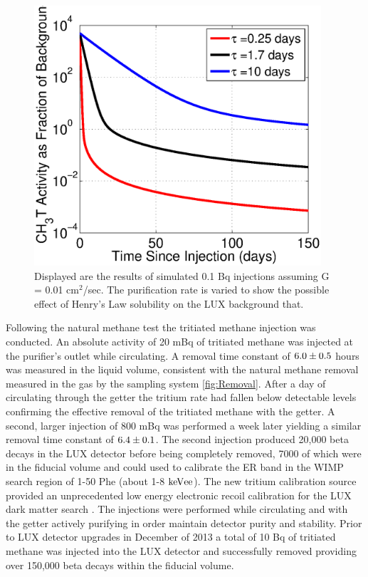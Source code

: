 \begin{figure}[H]
\centering
\includegraphics[width=0.95\textwidth]{tau_var_CH3T.eps}
\caption{Displayed are the results of simulated 0.1 Bq injections assuming G = 0.01 cm$^2$/sec. The purification rate is varied to show the possible effect of Henry's Law solubility on the LUX background that.}
\label{fig:tau_var}
\end{figure}


Following the natural methane test the tritiated methane injection was conducted. An absolute activity of 20 mBq of tritiated methane was injected at the purifier's outlet while circulating. A removal time constant of $\rm 6.0 \pm 0.5$ hours was measured in the liquid volume, consistent with the natural methane removal measured in the gas by the sampling system \ref{fig:Removal}. After a day of circulating through the getter the tritium rate had fallen below detectable levels confirming the effective removal of the tritiated methane with the getter. A second, larger injection of 800 mBq was performed a week later yielding a similar removal time constant of $\rm 6.4 \pm 0.1$. The second injection produced 20,000 beta decays in the LUX detector before being completely removed, 7000 of which were in the fiducial volume and could used to calibrate the ER band in the WIMP search region of 1-50 Phe (about 1-8 $\rm keV{ee}$). The new tritium calibration source provided an unprecedented low energy electronic recoil calibration for the LUX dark matter search \cite{LUX_PRL}. The injections were performed while circulating and with the getter actively purifying in order maintain detector purity and stability. Prior to LUX detector upgrades in December of 2013 a total of 10 Bq of tritiated methane was injected into the LUX detector and successfully removed providing over 150,000 beta decays within the fiducial volume. 

